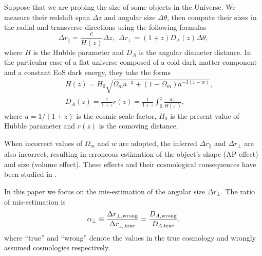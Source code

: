 \documentclass[iop]{emulateapj}
\begin{document}
Suppose that we are probing the size of some objects in the Universe.
We measure their redshift span $\Delta z$ and angular size $\Delta \theta$,
then compute their sizes in the radial and transverse directions using the following formulas
\begin{equation}\label{eq:distance}
\Delta r_{\parallel} = \frac{c}{H(z)}\Delta z,\ \ \Delta r_{\perp}=(1+z)D_A(z)\Delta \theta,
\end{equation}
where $H$ is the Hubble parameter and $D_A$ is the angular diameter distance.
In the particular case of a flat universe composed of a cold dark matter component and a constant EoS dark energy, they take the forms
\begin{eqnarray}\label{eq:HDA}
& &H(z) = H_0\sqrt{\Omega_ma^{-3}+(1-\Omega_m)a^{-3(1+w)}},\nonumber\\
& &D_A(z) = \frac{1}{1+z}r(z)=\frac{1}{1+z}\int_0^z \frac{dz^\prime}{H(z^\prime)},
\end{eqnarray}
where $a=1/(1+z)$ is the cosmic scale factor,
$H_0$ is the present value of Hubble parameter and $r(z)$ is the comoving distance.

When incorrect values of $\Omega_m$ and $w$ are adopted, 
the inferred $\Delta r_{\parallel}$ and $\Delta r_{\perp}$ are also incorrect,
resulting in erroneous estimation of the object's shape (AP effect) and size (volume effect).
These effects and their cosmological consequences have been studied in \cite{Li2014,Li2015,Li2016}.

In this paper we focus on the mis-estimation of the angular size $\Delta r_{\perp}$. %
The ratio of mis-estimation is
\begin{equation}\label{eq:DA}
 \alpha_{\perp} \equiv \frac{\Delta r_{\perp, \rm wrong}}{\Delta r_{\perp, \rm true}}
 = \frac{D_{A, \rm wrong}}{D_{A, \rm true}},
\end{equation}
where ``true'' and ``wrong'' denote the values in the true cosmology and wrongly assumed cosmologies respectively.
\end{document}
